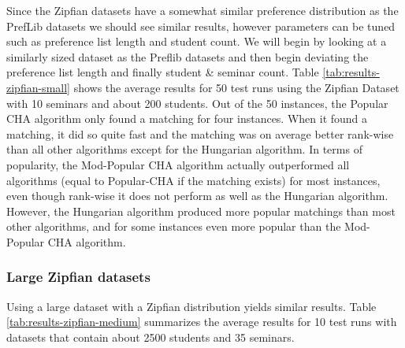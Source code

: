 Since the Zipfian datasets have a somewhat similar preference distribution as the PrefLib datasets we should see similar results, however parameters can be tuned such as preference list length and student count. We will begin by looking at a similarly sized dataset as the Preflib datasets and then begin deviating the preference list length and finally student \& seminar count. Table \ref{tab:results-zipfian-small}
shows the average results for 50 test runs using the Zipfian Dataset with 10 seminars and about 200 students. Out of the 50 instances, the Popular CHA algorithm only found a matching for four instances. When it found a matching, it did so quite fast and the matching was on average better rank-wise than all other algorithms except for the Hungarian algorithm. In terms of popularity, the Mod-Popular CHA algorithm actually outperformed all algorithms (equal to Popular-CHA if the matching exists) for most instances, even though rank-wise it does not perform as well as the Hungarian algorithm. However, the Hungarian algorithm produced more popular matchings than most other algorithms, and for some instances even more popular than the Mod-Popular CHA algorithm.

\subsubsection{Large Zipfian datasets}
Using a large dataset with a Zipfian distribution yields similar results. Table \ref{tab:results-zipfian-medium} summarizes the average results for 10 test runs with datasets that contain about 2500 students and 35 seminars.

\begin{table}[h!]
  \centering
  \caption{Average results for large Zipfian dataset (2500 Students) with 10 runs}
  \label{tab:results-zipfian-medium}
\end{table}

